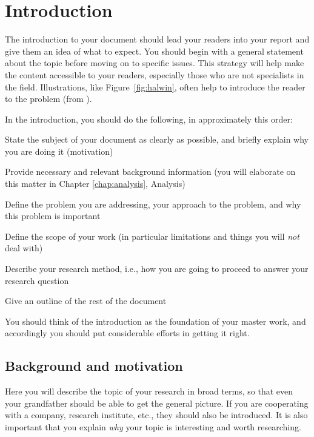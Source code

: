 \chapter{Introduction}
\label{chap:intro}

The introduction to your document should lead your
readers into your report and give them an idea of what to expect.
You should
begin with a general statement about the topic before moving on
to specific issues. This strategy will help make the content
accessible to your readers, especially those who are not specialists
in the field. Illustrations, like Figure~\ref{fig:halwin}, often
help to introduce the reader to the problem (from  \parencite{kjeldsen05cor}).

\label{fig:halwin}


In the introduction, you should do the following, in approximately this order:
\begin{compactitem}
  \item State the subject of your document as clearly as possible, and briefly explain why you are doing it (motivation)
    \item Provide necessary and relevant background information (you will elaborate on this matter in Chapter \ref{chap:analysis}, Analysis)
  \item Define the problem you are addressing, your approach to the problem, and why this problem is important
  \item Define the scope of your work (in particular limitations and things you will {\em not} deal with)
  \item Describe your research method, i.e., how you are going to proceed to answer your research question
  \item Give an outline of the rest of the document
\end{compactitem}

You should think of the introduction  as the foundation of your master work, and accordingly you should put considerable efforts in getting it right. 


\section{Background and motivation}
\label{sec:background-motivation}

Here you will describe the topic of your research in broad terms, so that even your grandfather should be able to get the general picture. If you are cooperating with a company, research institute, etc., they should also be introduced. It is also important that you explain {\em why} your topic is interesting and worth researching.

